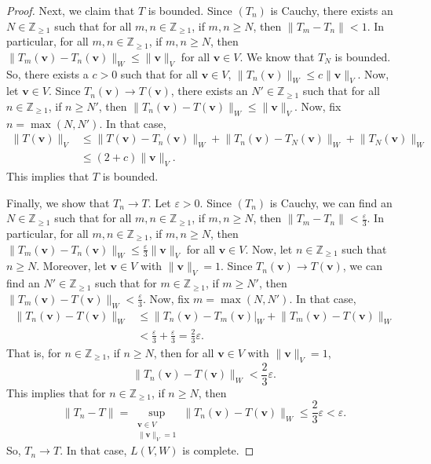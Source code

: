 \documentclass[a4paper, openany]{memoir}
\theoremstyle{definition}
\theoremstyle{plain}
\begin{document}
\begin{proof}
        Next, we claim that $T$ is bounded. Since $(T_n)$ is Cauchy, there exists an $N \in \mathbb{Z}_{\geq 1}$ such that for all $m, n \in \mathbb{Z}_{\geq 1}$, if $m, n \geq N$, then $\lVert T_m - T_n \rVert < 1$. In particular, for all $m, n \in \mathbb{Z}_{\geq 1}$, if $m, n \geq N$, then $\lVert T_m(\bm{v}) - T_n(\bm{v}) \rVert_W \leq \lVert \bm{v} \rVert_V$ for all $\bm{v} \in V$. We know that $T_N$ is bounded. So, there exists a $c > 0$ such that for all $\bm{v} \in V$, $\lVert T_n(\bm{v}) \rVert_W \leq c \lVert \bm{v} \rVert_V$. Now, let $\bm{v} \in V$. Since $T_n(\bm{v}) \to T(\bm{v})$, there exists an $N' \in \mathbb{Z}_{\geq 1}$ such that for all $n \in \mathbb{Z}_{\geq 1}$, if $n \geq N'$, then $\lVert T_n(\bm{v}) - T(\bm{v}) \rVert_W \leq \lVert \bm{v} \rVert_V$. Now, fix $n = \max(N, N')$. In that case,
        \begin{align*}
            \lVert T(\bm{v}) \rVert_V &\leq \lVert T(\bm{v}) - T_n(\bm{v}) \rVert_W + \lVert T_n(\bm{v}) - T_N(\bm{v}) \rVert_W + \lVert T_N(\bm{v}) \rVert_W \\
            &\leq (2 + c) \lVert \bm{v} \rVert_V.
        \end{align*}
        This implies that $T$ is bounded.

        Finally, we show that $T_n \to T$. Let $\varepsilon > 0$. Since $(T_n)$ is Cauchy, we can find an $N \in \mathbb{Z}_{\geq 1}$ such that for all $m, n \in \mathbb{Z}_{\geq 1}$, if $m, n \geq N$, then $\lVert T_m - T_n \rVert < \frac{\varepsilon}{3}$. In particular, for all $m, n \in \mathbb{Z}_{\geq 1}$, if $m, n \geq N$, then $\lVert T_m(\bm{v}) - T_n(\bm{v}) \rVert_W \leq \frac{\varepsilon}{3} \lVert \bm{v} \rVert_V$ for all $\bm{v} \in V$. Now, let $n \in \mathbb{Z}_{\geq 1}$ such that $n \geq N$. Moreover, let $\bm{v} \in V$ with $\lVert \bm{v} \rVert_V = 1$. Since $T_n(\bm{v}) \to T(\bm{v})$, we can find an $N' \in \mathbb{Z}_{\geq 1}$ such that for $m \in \mathbb{Z}_{\geq 1}$, if $m \geq N'$, then $\lVert T_m(\bm{v}) - T(\bm{v}) \rVert_W < \frac{\varepsilon}{3}$. Now, fix $m = \max(N, N')$. In that case,
        \begin{align*}
            \lVert T_n(\bm{v}) - T(\bm{v}) \rVert_W &\leq \lVert T_n(\bm{v}) - T_m(\bm{v})\rvert_W + \lVert T_m(\bm{v}) - T(\bm{v}) \rVert_W \\
            &< \frac{\varepsilon}{3} + \frac{\varepsilon}{3} = \frac{2}{3} \varepsilon.
        \end{align*}
        That is, for $n \in \mathbb{Z}_{\geq 1}$, if $n \geq N$, then for all $\bm{v} \in V$ with $\lVert \bm{v} \rVert_V = 1$,
        \[\lVert T_n(\bm{v}) - T(\bm{v}) \rVert_W < \frac{2}{3} \varepsilon.\]
        This implies that for $n \in \mathbb{Z}_{\geq 1}$, if $n \geq N$, then
        \[\lVert T_n - T \rVert = \sup_{\substack{\bm{v} \in V \\ \lVert \bm{v} \rVert_V = 1}} \lVert T_n(\bm{v}) - T(\bm{v}) \rVert_W \leq \frac{2}{3} \varepsilon < \varepsilon.\]
        So, $T_n \to T$. In that case, $L(V, W)$ is complete.
    \end{proof}
    \newpage
\end{document}
